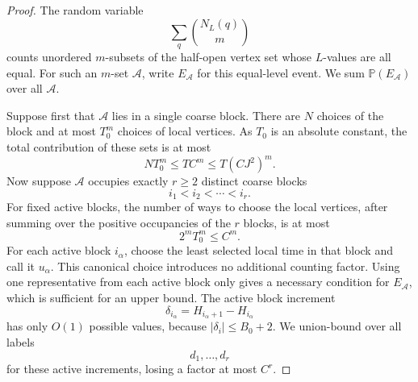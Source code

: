 \documentclass[11pt]{article}
\theoremstyle{definition}
\theoremstyle{remark}
\newcommand{\Pp}{\mathbb P}
\newcommand{\1}{\mathbf 1}
\begin{document}
\begin{proof}
The random variable
\[
\sum_q\binom{N_L(q)}{m}
\]
counts unordered $m$-subsets of the half-open vertex set whose $L$-values are all equal.  For such an $m$-set $\mathcal A$, write $E_\mathcal A$ for this equal-level event.  We sum $\Pp(E_\mathcal A)$ over all $\mathcal A$.

\bigskip
\noindent
Suppose first that $\mathcal A$ lies in a single coarse block.  There are $N$ choices of the block and at most $T_0^m$ choices of local vertices.  As $T_0$ is an absolute constant, the total contribution of these sets is at most
\[
NT_0^m\le T C^m\le T(CJ^2)^m.
\]
Now suppose $\mathcal A$ occupies exactly $r\ge2$ distinct coarse blocks
\[
i_1<i_2<\cdots<i_r.
\]
For fixed active blocks, the number of ways to choose the local vertices, after summing over the positive occupancies of the $r$ blocks, is at most
\[
2^mT_0^m\le C^m.
\]
For each active block $i_\alpha$, choose the least selected local time in that block and call it $u_\alpha$.  This canonical choice introduces no additional counting factor.  Using one representative from each active block only gives a necessary condition for $E_\mathcal A$, which is sufficient for an upper bound.  The active block increment
\[
\delta_{i_\alpha}=H_{i_\alpha+1}-H_{i_\alpha}
\]
has only $O(1)$ possible values, because $|\delta_i|\le B_0+2$.  We union-bound over all labels
\[
d_1,\ldots,d_r
\]
for these active increments, losing a factor at most $C^r$.


\end{proof}
\end{document}
